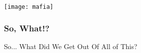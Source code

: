 \documentclass[aspectratio=169, 15pt,usenames,dvipsnames]{beamer}
\begin{document}
	\begin{gdblank}		
		\centering
		\texttt{[image: mafia]}
	\end{gdblank}
	\begin{gdblank}
		\frametitle{So, What!?}
		\centering
		\LARGE 
		So... What Did We Get Out Of All of This?
	\end{gdblank}	
\end{document}
